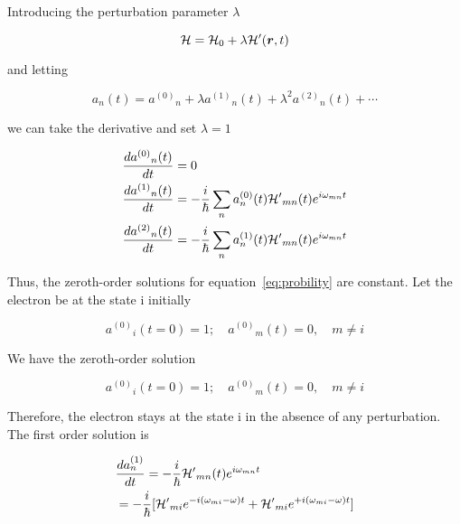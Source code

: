 Introducing the perturbation parameter $\lambda$


\begin{equation}
  \mathcal{H}=\mathcal{H}_0+\lambda\mathcal{H}^\prime(\bm{r},t)
\end{equation}

and letting

\begin{equation}
  a_n(t)={a^{(0)}}_n+\lambda{a^{(1)}}_n(t)+\lambda^2{a^{(2)}}_n(t)+\cdots
\end{equation}

we can take the derivative and set $\lambda=1$


\begin{eqnarray}
\begin{aligned}
  & \frac{d{{a^{(0)}}_n(t)}}{dt}=0 \\
  & \frac{d{{a^{(1)}}_n(t)}}{dt}=-\frac{i}{\hbar}\sum_{n}{a^{(0)}_n(t)}{\HAM^\prime}_{mn}(t)e^{i\omega_{mn}t}
\\
  & \frac{d{{a^{(2)}}_n(t)}}{dt}=- \frac{i}{\hbar}\sum_{n}{a^{(1)}_n(t)}{\HAM^\prime}_{mn}(t)e^{i\omega_{mn}t}
\\
\label{eq:probility}
\end{aligned}
\end{eqnarray}

Thus, the zeroth-order solutions for equation~\ref{eq:probility} are constant. Let the electron be at the state i initially

\begin{equation}
  {a^{(0)}}_i(t=0)=1; \quad {a^{(0)}}_m(t)=0, \quad m\neq {i}
\end{equation}

We have the zeroth-order solution

\begin{equation}
  {a^{(0)}}_i(t=0)=1; \quad {a^{(0)}}_m(t)=0, \quad m\neq {i}
\end{equation}

Therefore, the electron stays at the state i in the absence of any perturbation. The first order solution is

\begin{eqnarray}
\begin{aligned}
  & \frac{d{a^{(1)}_n}}{dt}=-\frac{i}{\hbar}{\mathcal{H}^\prime}_{mn}(t)e^{i\omega_{mn}t} \\
  & = -\frac{i}{\hbar}[{\mathcal{H}^\prime}_{mi}e^{-i(\omega_{mi}-\omega)t}+{\mathcal{H}^\prime}_{mi}e^{+i(\omega_{mi}-\omega)t}]
\end{aligned}
\end{eqnarray}

